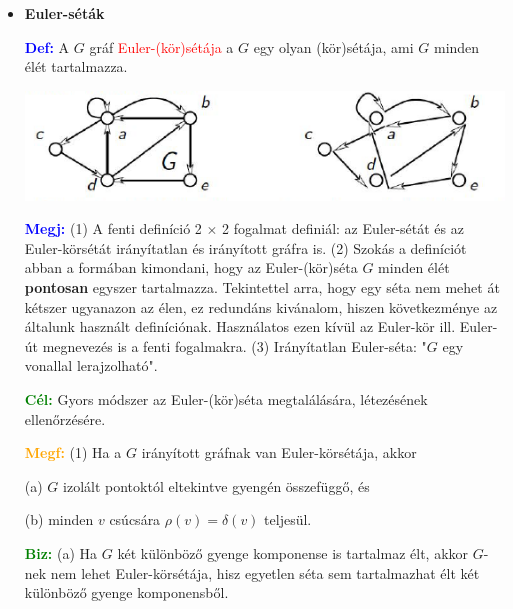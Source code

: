 \documentclass[../../szobeli.tex]{subfiles}
\begin{document}
\begin{center}
    \noindent{}
\end{center}

    \begin{itemize}
        \item \textbf{Euler-séták}

        \textcolor{blue}{\textbf{Def:}} A $G$ gráf \textcolor{red}{Euler-(kör)sétája} a $G$ egy olyan (kör)sétája, ami $G$ minden élét tartalmazza.

        \includegraphics[width=\textwidth]{img/1.png}

        \textcolor{blue}{\textbf{Megj:}} (1) A fenti definíció 2 $\times$ 2 fogalmat definiál: az Euler-sétát és az Euler-körsétát irányítatlan és irányított gráfra is. (2) Szokás a definíciót abban a formában kimondani, hogy az Euler-(kör)séta $G$ minden élét \textbf{pontosan} egyszer tartalmazza. Tekintettel arra, hogy egy séta nem mehet át kétszer ugyanazon az élen, ez redundáns kivánalom, hiszen következménye az általunk használt definíciónak. Használatos ezen kívül az Euler-kör ill. Euler-út megnevezés is a fenti fogalmakra. (3) Irányítatlan Euler-séta: "$G$ egy vonallal lerajzolható".

        \textcolor{green}{\textbf{Cél:}} Gyors módszer az Euler-(kör)séta megtalálására, létezésének ellenőrzésére.

        \textcolor{orange}{\textbf{Megf:}} (1) Ha a $G$ irányított gráfnak van Euler-körsétája, akkor 

            (a) $G$ izolált pontoktól eltekintve gyengén összefüggő, és 

            (b) minden $v$ csúcsára $\rho(v) = \delta(v)$ teljesül.

        \textcolor{green}{\textbf{Biz:}} (a) Ha $G$ két különböző gyenge komponense is tartalmaz élt, akkor $G$-nek nem lehet Euler-körsétája, hisz egyetlen séta sem tartalmazhat élt két különböző gyenge komponensből. \checkmark


\end{itemize}
\end{document}
